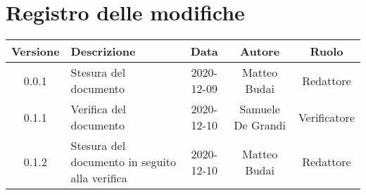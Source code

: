 \section*{Registro delle modifiche}

\begin{center}
	\begin{longtable}{|c|p{5cm}|c|c|c|}
	\hline
	\rowcolor{lighter-grayer}
	\textbf{Versione} & \textbf{Descrizione} & \textbf{Data} & \textbf{Autore} & \textbf{Ruolo} \\
	\hline
	\endfirsthead


		\hline
	0.0.1 & Stesura del documento & 2020-12-09 & Matteo Budai & Redattore \\
	\hline
	0.1.1 & Verifica del documento & 2020-12-10 & Samuele De Grandi & Verificatore \\
	\hline
	0.1.2 & Stesura del documento in seguito alla verifica & 2020-12-10 & Matteo Budai & Redattore \\
	\hline

	\end{longtable}
\end{center}